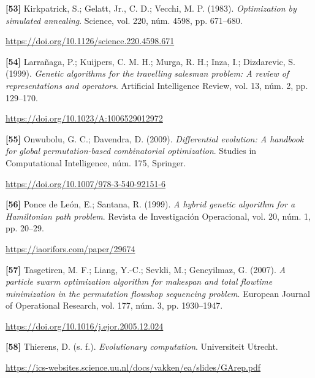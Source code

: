 \documentclass[11pt,a4paper]{article}
\newcommand{\referencia}[1]{\par\addvspace{0.8\baselineskip}\noindent\hangindent=1.1cm\hangafter=1 #1\par\nopagebreak}
\begin{document}
\begin{samepage}
\referencia{\textbf{[53]} Kirkpatrick, S.; Gelatt, Jr., C. D.; Vecchi, M. P. (1983). \textit{Optimization by simulated annealing}. Science, vol. 220, núm. 4598, pp. 671--680.}
 {\small\url{https://doi.org/10.1126/science.220.4598.671}}\par
\end{samepage}
\begin{samepage}
\referencia{\textbf{[54]} Larra{\~n}aga, P.; Kuijpers, C. M. H.; Murga, R. H.; Inza, I.; Dizdarevic, S. (1999). \textit{Genetic algorithms for the travelling salesman problem: A review of representations and operators}. Artificial Intelligence Review, vol. 13, núm. 2, pp. 129--170.}
 {\small\url{https://doi.org/10.1023/A:1006529012972}}\par
\end{samepage}
\begin{samepage}
\referencia{\textbf{[55]} Onwubolu, G. C.; Davendra, D. (2009). \textit{Differential evolution: A handbook for global permutation-based combinatorial optimization}. Studies in Computational Intelligence, núm. 175, Springer.}
 {\small\url{https://doi.org/10.1007/978-3-540-92151-6}}\par
\end{samepage}
\begin{samepage}
\referencia{\textbf{[56]} {Ponce de Le{\'o}n}, E.; Santana, R. (1999). \textit{A hybrid genetic algorithm for a {Hamiltonian} path problem}. Revista de Investigaci{\'o}n Operacional, vol. 20, núm. 1, pp. 20--29.}
 {\small\url{https://iaorifors.com/paper/29674}}\par
\end{samepage}
\begin{samepage}
\referencia{\textbf{[57]} Tasgetiren, M. F.; Liang, Y.-C.; Sevkli, M.; Gencyilmaz, G. (2007). \textit{A particle swarm optimization algorithm for makespan and total flowtime minimization in the permutation flowshop sequencing problem}. European Journal of Operational Research, vol. 177, núm. 3, pp. 1930--1947.}
 {\small\url{https://doi.org/10.1016/j.ejor.2005.12.024}}\par
\end{samepage}
\begin{samepage}
\referencia{\textbf{[58]} Thierens, D. (s. f.). \textit{Evolutionary computation}. Universiteit Utrecht.}
 {\small\url{https://ics-websites.science.uu.nl/docs/vakken/ea/slides/GArep.pdf}}\par
\end{samepage}
\end{document}
